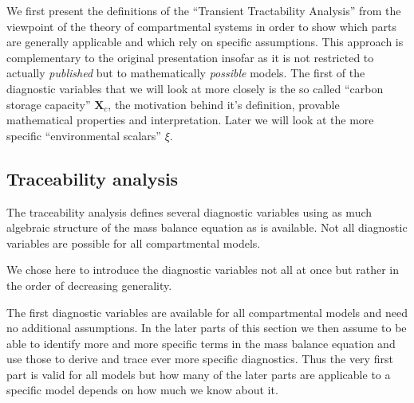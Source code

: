\documentclass[journal abbreviation, manuscript]{copernicus}
\theoremstyle{definition}
\newcommand{\X}{\mathbf{X}}
\begin{document}


\introduction  %
We first present the definitions of the ``Transient Tractability Analysis'' 
from the viewpoint of the theory of compartmental systems in order to show which parts are generally applicable and which rely on specific assumptions. 
This approach is complementary to the original presentation insofar as it is not restricted to actually \emph{published} but to mathematically {\it possible} models.  
The first of the diagnostic variables that we will look at more closely is the so called ``carbon storage capacity'' $\X_c$, the motivation behind it's definition, provable mathematical properties and interpretation.
Later we will look at the more specific ``environmental scalars'' $\xi$.


\subsection{Traceability analysis}
The traceability analysis defines several diagnostic variables using as much algebraic structure of the mass balance equation as is available.
Not all diagnostic variables are possible for all compartmental models. 

We chose here to introduce the diagnostic variables not all at once but rather in the order of decreasing generality.

The first diagnostic variables are available for all compartmental models and need no additional assumptions. 
In the later parts of this section we then assume to be able to identify more and more specific terms in the mass balance equation and use those to derive and trace ever more specific diagnostics.
Thus the very first part is valid for all models but how many of the later parts are applicable to a specific model  depends on how much we know about it.  
\end{document}
